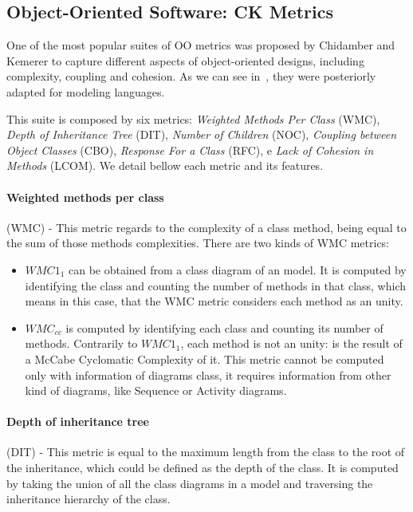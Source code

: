 \subsection{Object-Oriented Software: \textrm{CK} Metrics}
One of the most popular suites of OO metrics was proposed by Chidamber and Kemerer \cite{Chidamber:1994:MSO:630808.631131} to capture different aspects of object-oriented designs, including complexity, coupling and cohesion. 
As we can see in~\cite{Power2}, they were posteriorly adapted for modeling languages.

This suite is composed by six metrics: \emph{Weighted Methods Per Class} (WMC), \emph{Depth of Inheritance Tree} (DIT), \emph{Number of Children} (NOC), \emph{Coupling between Object Classes} (CBO), \emph{Response For a Class} (RFC), e \emph{Lack of Cohesion in Methods} (LCOM).
We detail bellow each metric and its features.

\paragraph{Weighted methods per class} (WMC) - This metric regards to the complexity of a class method, being equal to the sum of those methods complexities. There are two kinds of WMC metrics:
\begin{itemize}
\item \textbf{$WMC1_{1}$} can be obtained from a class diagram of an \umlS model. It is computed by identifying the class and counting the number of methods in that class, which means in this case, that the WMC metric considers each method as an unity.
\item \textbf{$WMC_{cc}$} is computed by identifying each class and counting its number of methods. Contrarily to \textbf{$WMC1_{1}$}, each method is not an unity: is the result of a McCabe Cyclomatic Complexity of it. This metric cannot be computed only with information of diagrams class, it requires information from other kind of diagrams, like Sequence or Activity diagrams.
\end{itemize}

\paragraph{Depth of inheritance tree} (DIT) - This metric is equal to the maximum length from the class to the root of the inheritance, which could be defined as the depth of the class. It is computed by taking the union of all the class diagrams in a \umlS model and traversing the inheritance hierarchy of the class.


